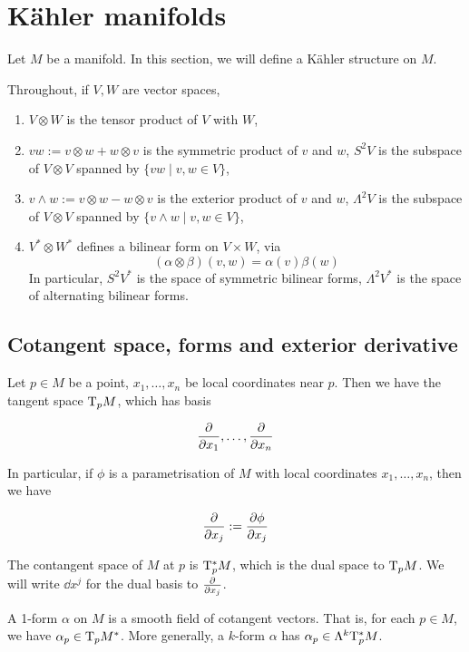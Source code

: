 \documentclass{report}
\begin{document}
\section{K\"ahler manifolds}

Let \(M\) be a manifold. In this section, we will define a K\"ahler structure on \(M\).

Throughout, if \(V, W\) are vector spaces,

\begin{enumerate}
    \item \(V \otimes W\) is the tensor product of \(V\) with \(W\),
    \item \(vw := v \otimes w + w \otimes v\) is the symmetric product of \(v\) and \(w\), \(S^2V\) is the subspace of \(V \otimes V\) spanned by \(\{vw \mid v, w \in V\}\),
    \item \(v \wedge w := v \otimes w - w\otimes v\) is the exterior product of \(v\) and \(w\), \(\Lambda^2 V\) is the subspace of \(V \otimes V\) spanned by \(\{v \wedge w \mid v, w \in V\}\),
    \item \(V^* \otimes W^*\) defines a bilinear form on \(V \times W\), via 
    \[(\alpha \otimes \beta)(v, w) = \alpha(v)\beta(w)\]
    In particular, \(S^2V^*\) is the space of symmetric bilinear forms, \(\Lambda^2 V^*\) is the space of alternating bilinear forms.
\end{enumerate}

\subsection{Cotangent space, forms and exterior derivative}

Let \(p \in M\) be a point, \(x_1, \dots, x_n\) be local coordinates near \(p\). Then we have the tangent space \(\mathrm{T}_p M\), which has basis

\[\pdv{x_1}, \dots, \pdv{x_n}\]

In particular, if \(\phi\) is a parametrisation of \(M\) with local coordinates \(x_1, \dots, x_n\), then we have

\[\pdv{x_j} := \pdv{\phi}{x_j}\]

\begin{definition}
     The contangent space of \(M\) at \(p\) is \(\mathrm{T}_p^*M\), which is the dual space to \(\mathrm{T}_pM\). We will write \(\dd x^j\) for the dual basis to \(\pdv{x_j}\).
\end{definition}

\begin{definition}
    [k-form] A 1-form \(\alpha\) on \(M\) is a smooth field of cotangent vectors. That is, for each \(p \in M\), we have \(\alpha_p \in \mathrm{T}_pM^*\). More generally, a \(k\)-form \(\alpha\) has \(\alpha_p \in \Lambda^k \mathrm{T}_p^*M\).
\end{definition}
\end{document}
